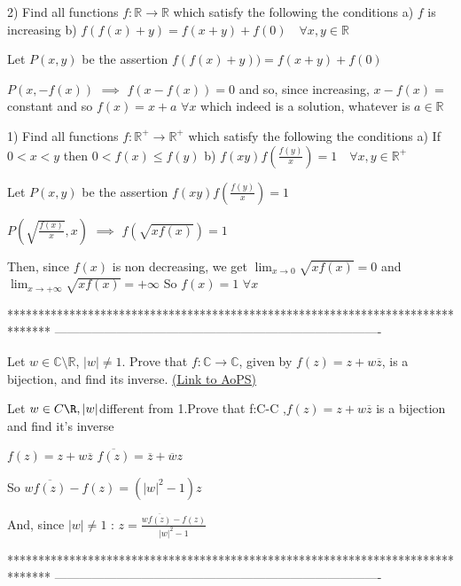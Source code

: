 \begin{solution}
	\begin{tcolorbox}2) Find all  functions $f:\mathbb{R}\to\mathbb{R}$  which satisfy the following the conditions
a) $f$ is increasing
b) $f(f(x)+y)=f(x+y)+f(0)  \quad \forall x,y \in \mathbb{R}$\end{tcolorbox}
Let $P(x,y)$ be the assertion $f(f(x)+y))=f(x+y)+f(0)$

$P(x,-f(x))$ $\implies$ $f(x-f(x))=0$ and so, since increasing, $x-f(x)=$ constant and so $\boxed{f(x)=x+a}$ $\forall x$ which indeed is a solution, whatever is $a\in\mathbb R$
\end{solution}



\begin{solution}
	\begin{tcolorbox}1) Find all  functions $f:\mathbb{R}^+\to\mathbb{R}^+$  which satisfy the following the conditions
a) If $0<x<y$ then $0<f(x)\leq f(y)$
b) $f(xy)f\left ( \frac{f(y)}{x} \right )=1 \quad \forall x,y \in \mathbb{R}^+$\end{tcolorbox}
Let $P(x,y)$ be the assertion $f(xy)f(\frac{f(y)}x)=1$

$P(\sqrt{\frac{f(x)}x},x)$ $\implies$ $f(\sqrt{xf(x)})=1$

Then, since $f(x)$ is non decreasing, we get $\lim_{x\to 0}\sqrt{xf(x)}=0$ and $\lim_{x\to +\infty}\sqrt{xf(x)}=+\infty$ 
So $\boxed{f(x)=1}$ $\forall x$
\end{solution}
*******************************************************************************
-------------------------------------------------------------------------------

\begin{problem}
	Let $w\in \mathbb{C}\setminus \mathbb{R}$, $|w|\neq 1$. Prove that $f: \mathbb{C} \to \mathbb{C}$, given by $f(z)= z+w\overline{z}$, is a bijection, and find its inverse.
	\flushright \href{https://artofproblemsolving.com/community/c6h563297}{(Link to AoPS)}
\end{problem}



\begin{solution}
	\begin{tcolorbox}Let $w\in C\R,|w|$different from 1.Prove that f:C-C ,$f(z)=z+w\overline{z}$ is a bijection and find it's inverse\end{tcolorbox}
$f(z)=z+w\overline z$
$\overline{f(z)}=\overline z+\overline wz$

So $w\overline{f(z)}-f(z)=(|w|^2-1)z$

And, since $|w|\ne 1$ : $\boxed{z=\frac{w\overline{f(z)}-f(z)}{|w|^2-1}}$
\end{solution}
*******************************************************************************
-------------------------------------------------------------------------------

